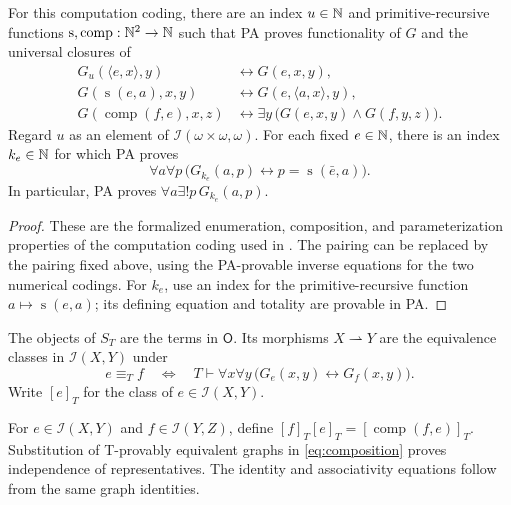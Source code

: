 \begin{lemma}\label{lem:arithmetized-evaluation}
For this computation coding, there are an index $u\in\mathbb N$ and
primitive-recursive functions
$\operatorname{s},\operatorname{comp}:\mathbb N^2\to\mathbb N$
such that PA proves functionality
of $G$ and the universal closures of
\begin{align}
 G_u(\langle e,x\rangle,y)
   &\leftrightarrow G(e,x,y),
   \label{eq:arithmetized-universal}\\
 G(\operatorname{s}(e,a),x,y)
   &\leftrightarrow G(e,\langle a,x\rangle,y),
   \label{eq:arithmetized-specialization}\\
 G(\operatorname{comp}(f,e),x,z)
   &\leftrightarrow
     \exists y\,\bigl(G(e,x,y)\land G(f,y,z)\bigr).
   \label{eq:composition}
\end{align}
Regard $u$ as an element of $\mathcal I(\omega\times\omega,\omega)$.
For each fixed $e\in\mathbb N$, there is an index
$k_e\in\mathbb N$ for which PA proves
\[
 \forall a\forall p\,
 \bigl(G_{k_e}(a,p)\leftrightarrow
       p=\operatorname{s}(\bar e,a)\bigr).
\]
In particular, PA proves $\forall a\exists!p\,G_{k_e}(a,p)$.
\end{lemma}
\begin{proof}
These are the formalized enumeration, composition, and
parameterization properties of the computation coding used in
\cite[p.~108; p.~115, Note~1]{Montagna}.
The pairing can be replaced by the pairing fixed above, using
the PA-provable inverse equations for the two numerical codings.
For $k_e$, use an index for the primitive-recursive function
$a\mapsto\operatorname{s}(e,a)$; its defining equation and
totality are provable in PA.
\end{proof}

The objects of $S_T$ are the terms in $\mathsf O$. Its morphisms
$X\rightharpoonup Y$ are the equivalence classes in
$\mathcal I(X,Y)$ under
\begin{equation}\label{eq:uniform}
 e\equiv_T f
 \quad\Longleftrightarrow\quad
 T\vdash \forall x\forall y\,
       \bigl(G_e(x,y)\leftrightarrow G_f(x,y)\bigr).
\end{equation}
Write $[e]_T$ for the class of $e\in\mathcal I(X,Y)$.

For $e\in\mathcal I(X,Y)$ and $f\in\mathcal I(Y,Z)$, define
$[f]_T[e]_T=[\operatorname{comp}(f,e)]_T$.
Substitution of T-provably equivalent graphs in
\eqref{eq:composition} proves independence of representatives.
The identity and associativity equations follow from the same
graph identities.

